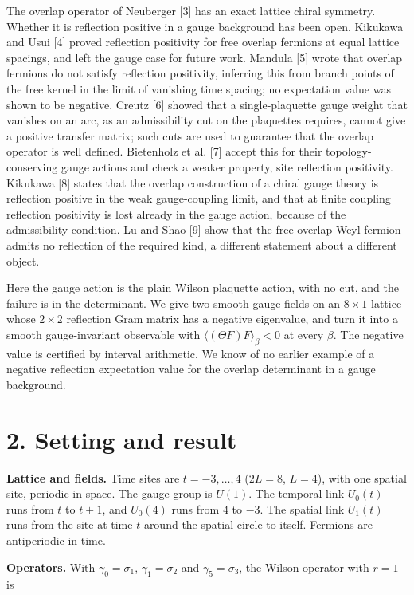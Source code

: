 \documentclass[11pt,a4paper]{article}
\begin{document}
The overlap operator of Neuberger [3] has an exact lattice chiral symmetry. Whether it is reflection positive in a gauge background has been open. Kikukawa and Usui [4] proved reflection positivity for free overlap fermions at equal lattice spacings, and left the gauge case for future work. Mandula [5] wrote that overlap fermions do not satisfy reflection positivity, inferring this from branch points of the free kernel in the limit of vanishing time spacing; no expectation value was shown to be negative. Creutz [6] showed that a single-plaquette gauge weight that vanishes on an arc, as an admissibility cut on the plaquettes requires, cannot give a positive transfer matrix; such cuts are used to guarantee that the overlap operator is well defined. Bietenholz et al. [7] accept this for their topology-conserving gauge actions and check a weaker property, site reflection positivity. Kikukawa [8] states that the overlap construction of a chiral gauge theory is reflection positive in the weak gauge-coupling limit, and that at finite coupling reflection positivity is lost already in the gauge action, because of the admissibility condition. Lu and Shao [9] show that the free overlap Weyl fermion admits no reflection of the required kind, a different statement about a different object.

Here the gauge action is the plain Wilson plaquette action, with no cut, and the failure is in the determinant. We give two smooth gauge fields on an $8\times 1$ lattice whose $2\times2$ reflection Gram matrix has a negative eigenvalue, and turn it into a smooth gauge-invariant observable with $\langle(\Theta F)F\rangle_\beta<0$ at every $\beta$. The negative value is certified by interval arithmetic. We know of no earlier example of a negative reflection expectation value for the overlap determinant in a gauge background.


\section*{2. Setting and result}
{\bfseries\boldmath Lattice and fields.} Time sites are $t=-3,\dots,4$ ($2L=8$, $L=4$), with one spatial site, periodic in space. The gauge group is $U(1)$. The temporal link $U_0(t)$ runs from $t$ to $t+1$, and $U_0(4)$ runs from $4$ to $-3$. The spatial link $U_1(t)$ runs from the site at time $t$ around the spatial circle to itself. Fermions are antiperiodic in time.

{\bfseries\boldmath Operators.} With $\gamma_0=\sigma_1$, $\gamma_1=\sigma_2$ and $\gamma_5=\sigma_3$, the Wilson operator with $r=1$ is
\end{document}
